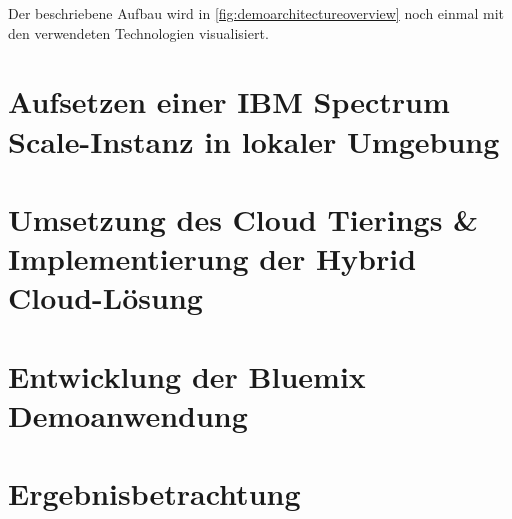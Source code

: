 Der beschriebene Aufbau wird in \autoref{fig:demoarchitectureoverview} noch einmal mit den verwendeten Technologien visualisiert. 

\section{Aufsetzen einer IBM Spectrum Scale-Instanz in lokaler Umgebung}


\section{Umsetzung des Cloud Tierings \& Implementierung der Hybrid Cloud-Lösung}


\section{Entwicklung der Bluemix Demoanwendung}\label{sec:application}


\section{Ergebnisbetrachtung}
